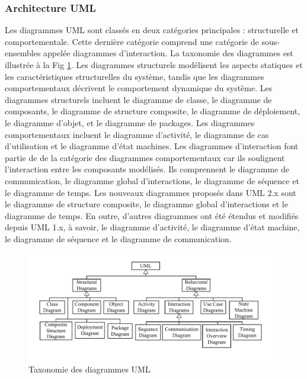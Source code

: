 \documentclass[french]{spimufcphdthesis}
\begin{document}
\subsubsection{Architecture UML}

 Les diagrammes UML sont classés en deux catégories principales : structurelle et comportementale. Cette dernière catégorie comprend une catégorie de sous-ensembles appelée diagrammes d'interaction. La taxonomie des diagrammes est illustrée à la Fig \ref{UML_diag}.
Les diagrammes structurels modélisent les aspects statiques et les caractéristiques structurelles du système, tandis que les diagrammes comportementaux décrivent le comportement dynamique du système.
Les diagrammes structurels incluent le diagramme de classe, le diagramme de composants, le diagramme de structure composite, le diagramme de déploiement, le diagramme d’objet, et le diagramme de packages. 
Les diagrammes comportementaux incluent le diagramme d’activité, le diagramme de cas d'utilisation et le diagramme d’état machines. 
Les diagrammes d'interaction font partie de de la catégorie des diagrammes comportementaux car ils soulignent l'interaction entre les composants modélisés. Ils comprennent le diagramme de communication, le diagramme global d’interactions, le diagramme de séquence et le diagramme de temps. 
Les nouveaux diagrammes proposés dans UML 2.x sont le diagramme de structure composite, le diagramme global d’interactions et le diagramme de temps. En outre, d'autres diagrammes ont été étendus et modifiés depuis UML 1.x, à savoir, le diagramme d’activité, le diagramme d’état machine, le diagramme de séquence et le diagramme de communication.

\begin{figure}[H]
\begin{center}
\includegraphics[scale=0.45]{figures/UML.png}
\caption{Taxonomie des diagrammes UML}
\label{UML_diag}
\end{center}
\end{figure}
\end{document}
